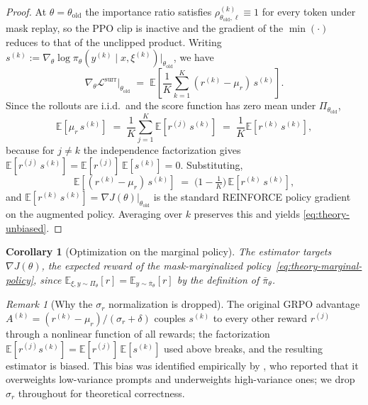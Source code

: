 \documentclass[11pt]{article}
\newtheorem{corollary}[theorem]{Corollary}
\theoremstyle{definition}
\theoremstyle{remark}
\newtheorem{remark}[theorem]{Remark}
\newcommand{\E}{\mathbb{E}}
\newcommand{\Loss}{\mathcal{L}}
\newcommand{\old}{\mathrm{old}}
\begin{document}
\begin{proof}
At $\theta = \theta_\old$ the importance ratio satisfies
$\rho_{\theta_\old, \ell}^{(k)} \equiv 1$ for every token under mask
replay, so the PPO clip is inactive and the gradient of the
$\min(\cdot)$ reduces to that of the unclipped product.  Writing
$s^{(k)} := \nabla_\theta \log \pi_\theta(y^{(k)} \mid x, \xi^{(k)})\big|_{\theta_\old}$,
we have
\begin{equation*}
\nabla_\theta \Loss^{\mathrm{surr}}\big|_{\theta_\old}
   \;=\;
\E\!\left[\frac{1}{K}\sum_{k=1}^K (r^{(k)} - \mu_r)\,s^{(k)}\right].
\end{equation*}
Since the rollouts are i.i.d.\ and the score function has zero mean
under $\Pi_{\theta_\old}$,
\begin{equation*}
\E[\mu_r\, s^{(k)}]
   \;=\;
\frac{1}{K}\sum_{j=1}^K \E[r^{(j)}\, s^{(k)}]
   \;=\;
\frac{1}{K}\E[r^{(k)}\, s^{(k)}],
\end{equation*}
because for $j \ne k$ the independence factorization gives
$\E[r^{(j)}\, s^{(k)}] = \E[r^{(j)}]\,\E[s^{(k)}] = 0$.  Substituting,
\begin{equation*}
\E[(r^{(k)} - \mu_r)\,s^{(k)}]
   \;=\;
\Big(1 - \tfrac{1}{K}\Big)\,\E[r^{(k)}\, s^{(k)}],
\end{equation*}
and $\E[r^{(k)}\, s^{(k)}] = \nabla J(\theta)|_{\theta_\old}$ is the
standard REINFORCE policy gradient on the augmented policy.  Averaging
over $k$ preserves this and yields \eqref{eq:theory-unbiased}.
\end{proof}

\begin{corollary}[Optimization on the marginal policy]
\label{cor:marginal}
The estimator targets $\nabla J(\theta)$, the expected reward of the
mask-marginalized policy~\eqref{eq:theory-marginal-policy}, since
$\E_{\xi, y \sim \Pi_\theta}[r] = \E_{y \sim \bar\pi_\theta}[r]$ by
the definition of $\bar\pi_\theta$.
\end{corollary}

\begin{remark}[Why the $\sigma_r$ normalization is dropped]
\label{rem:sigma}
The original GRPO advantage
$A^{(k)} = (r^{(k)} - \mu_r)/(\sigma_r + \delta)$ couples
$s^{(k)}$ to every other reward $r^{(j)}$ through a nonlinear function
of all rewards; the factorization
$\E[r^{(j)} s^{(k)}] = \E[r^{(j)}]\,\E[s^{(k)}]$ used above breaks, and
the resulting estimator is biased.  This bias was identified
empirically by \citet{liu2024drgrpo}, who reported that it overweights
low-variance prompts and underweights high-variance ones; we drop
$\sigma_r$ throughout for theoretical correctness.
\end{remark}
\end{document}
